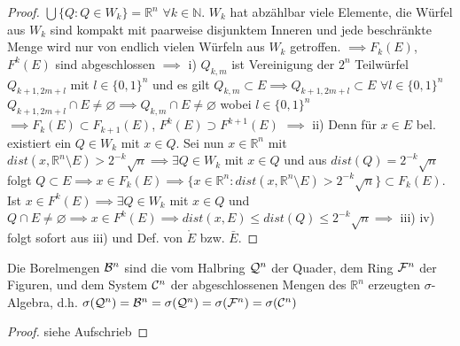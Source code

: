 \documentclass[11pt,a4paper,fleqn,openany]{report}
\begin{document}
    \begin{proof}
      $\bigcup\{Q:Q\in W_k\} = \mathbb{R}^n$ $\forall k\in\mathbb{N}$. \newline
      $W_k$ hat abzählbar viele Elemente, die Würfel aus $W_k$ sind kompakt mit paarweise disjunktem Inneren und jede beschränkte Menge wird nur von endlich vielen Würfeln aus $W_k$ getroffen. $\implies F_k(E)$, $F^k(E)$ sind abgeschlossen $\implies$ i) \newline
      $Q_{k,m}$ ist Vereinigung der $2^n$ Teilwürfel $Q_{k+1, 2m+l}$ mit $l\in \{0,1\}^n$ und es gilt \newline $Q_{k,m} \subset E \implies Q_{k+1, 2m+l} \subset E$ $\forall l\in\{0,1\}^n$ \newline
      $Q_{k+1,2m+l} \cap E \neq \varnothing \implies Q_{k,m} \cap E \neq \varnothing$ wobei $l\in\{0,1\}^n$ \newline
      $\implies F_k(E) \subset F_{k+1}(E)$, $F^k(E) \supset F^{k+1}(E)$ $\implies$ ii) \newline
      Denn für $x \in E$ bel. existiert ein $Q\in W_k$ mit $x\in Q$. \newline
      Sei nun $x\in\mathbb{R}^n$ mit $dist(x,\mathbb{R}^n\setminus E) > 2^{-k}\sqrt{n} \implies \exists Q\in W_k$ mit $x\in Q$ und aus $dist(Q) = 2^{-k}\sqrt{n}$ folgt $Q\subset E \implies x\in F_k(E)\implies \{x\in\mathbb{R}^n: dist(x,\mathbb{R}^n\setminus E) > 2^{-k}\sqrt{n}\} \subset F_k(E)$. \newline
      Ist $x\in F^k(E) \implies \exists Q\in W_k$ mit $x\in Q$ und $Q \cap E \neq \varnothing \implies x\in F^k(E) \implies dist(x,E) \leq dist(Q) \leq 2^{-k}\sqrt{n} \implies$ iii) \newline
      iv) folgt sofort aus iii) und Def. von $\mathring{E}$ bzw. $\bar{E}$. 
      
    \end{proof}


    \begin{lemma}
      Die Borelmengen $\mathcal{B}^n$ sind die vom Halbring $\mathcal{Q}^n$ der Quader, dem Ring $\mathcal{F}^n$ der Figuren, und dem System $\mathcal{C}^n$ der abgeschlossenen Mengen des $\mathbb{R}^n$ erzeugten $\sigma$-Algebra, d.h. $\sigma(\mathcal{Q}^n) = \mathcal{B}^n = \sigma(\mathcal{Q}^n) = \sigma(\mathcal{F}^n) = \sigma(\mathcal{C}^n)$
    \end{lemma}

    \begin{proof}
      siehe Aufschrieb
    \end{proof}
\end{document}
